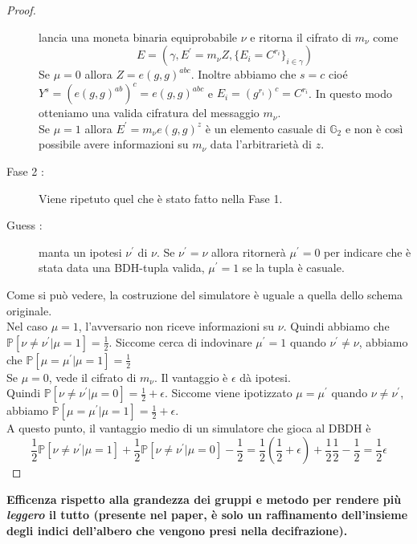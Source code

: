 \begin{thm}
\begin{proof}
\begin{description}
 lancia una moneta binaria equiprobabile $\nu$ e ritorna il cifrato di $m_\nu$ come
\[ E = (\gamma , E^\prime = m_\nu Z , \{ E_i = C^{r_i} \}_{i \in \gamma} ) \]
Se $\mu = 0$ allora $Z = e(g,g)^{abc}$. Inoltre abbiamo che $s = c$ cioé $Y^s = (e(g,g)^{ab})^c = e(g,g)^{abc}$ e $E_i = (g^{r_i})^c = C^{r_i}$. In questo modo otteniamo una valida cifratura del messaggio $m_\nu$.\\
Se $\mu = 1$ allora $E^\prime = m_\nu e(g,g)^z$ è un elemento casuale di $\mathbb{G}_2$ e non è così possibile avere informazioni su $m_\nu$ data l'arbitrarietà di $z$.
\item[Fase 2 :] Viene ripetuto quel che è stato fatto nella Fase 1.
\item[Guess :]  manta un ipotesi $\nu^\prime$ di $\nu$. Se $\nu^\prime = \nu$ allora  ritornerà $\mu^\prime = 0$ per indicare che è stata data una BDH-tupla valida, $\mu^\prime = 1$ se la tupla è casuale.
\end{description}

Come si può vedere, la costruzione del simulatore è uguale a quella dello schema originale.\\[0.5cm]
Nel caso $\mu = 1$, l'avversario non riceve informazioni su $\nu$. Quindi abbiamo che $\mathbb{P}[\nu \neq \nu^\prime | \mu = 1] = \frac{1}{2}$. Siccome  cerca di indovinare $\mu^\prime = 1$ quando $\nu^\prime \neq \nu$, abbiamo che $\mathbb{P}[\mu = \mu^\prime| \mu = 1] = \frac{1}{2}$\\
Se $\mu = 0$,  vede il cifrato di $m_\nu$. Il vantaggio è $\epsilon$ dà ipotesi.\\
Quindi $\mathbb{P}[\nu \neq \nu^\prime | \mu = 0] = \frac{1}{2} + \epsilon$. Siccome viene ipotizzato $ \mu = \mu^\prime$ quando $\nu \neq \nu^\prime$, abbiamo $\mathbb{P}[\mu = \mu^\prime | \mu = 1] = \frac{1}{2} + \epsilon$.\\
A questo punto, il vantaggio medio di un simulatore che gioca al DBDH è 
\[ \frac{1}{2} \mathbb{P}[\nu \neq \nu^\prime | \mu = 1] + \frac{1}{2}\mathbb{P}[\nu \neq \nu^\prime | \mu = 0] - \frac{1}{2}  = \frac{1}{2}\left( \frac{1}{2} + \epsilon \right) + \frac{1}{2}\frac{1}{2} - \frac{1}{2} = \frac{1}{2} \epsilon\]
\end{proof}
\end{thm}



\textbf{Efficenza rispetto alla grandezza dei gruppi e metodo per rendere più \emph{leggero} il tutto (presente nel paper, è solo un raffinamento dell'insieme degli indici dell'albero che vengono presi nella decifrazione).}

